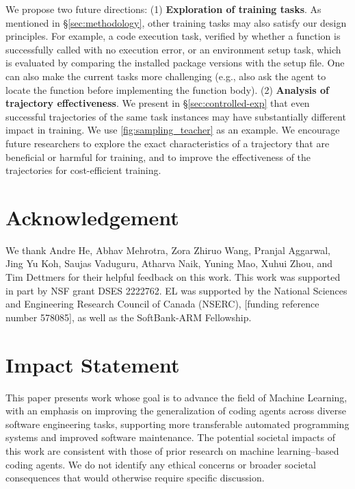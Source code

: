\documentclass{article}
\theoremstyle{plain}
\theoremstyle{definition}
\theoremstyle{remark}
\begin{document}
We propose two future directions:
(1) \textbf{Exploration of training tasks}. As mentioned in \S\ref{sec:methodology}, other training tasks may also satisfy our design principles. For example, a code execution task, verified by whether a function is successfully called with no execution error, or an environment setup task, which is evaluated by comparing the installed package versions with the setup file.
One can also make the current \methodName tasks more challenging (e.g., also ask the agent to locate the function before implementing the function body).
(2) \textbf{Analysis of trajectory effectiveness}. We present in \S\ref{sec:controlled-exp} that even successful trajectories of the same task instances may have substantially different impact in training. We use \autoref{fig:sampling_teacher} as an example. We encourage future researchers to explore the exact characteristics of a trajectory that are beneficial or harmful for training, and to improve the effectiveness of the trajectories for cost-efficient training.

\section{Acknowledgement}
We thank Andre He, Abhav Mehrotra, Zora Zhiruo Wang, Pranjal Aggarwal, Jing Yu Koh, Saujas Vaduguru, Atharva Naik, Yuning Mao, Xuhui Zhou, and Tim Dettmers for their helpful feedback on this work.
This work was supported in part by NSF grant DSES 2222762.  EL was supported by the National Sciences and Engineering Research Council of Canada (NSERC), [funding reference number 578085], as well as the SoftBank-ARM Fellowship.



\section*{Impact Statement}
This paper presents work whose goal is to advance the field of Machine Learning, with an emphasis on improving the generalization of coding agents across diverse software engineering tasks, supporting more transferable automated programming systems and improved software maintenance. The potential societal impacts of this work are consistent with those of prior research on machine learning–based coding agents. We do not identify any ethical concerns or broader societal consequences that would otherwise require specific discussion.




\end{document}
